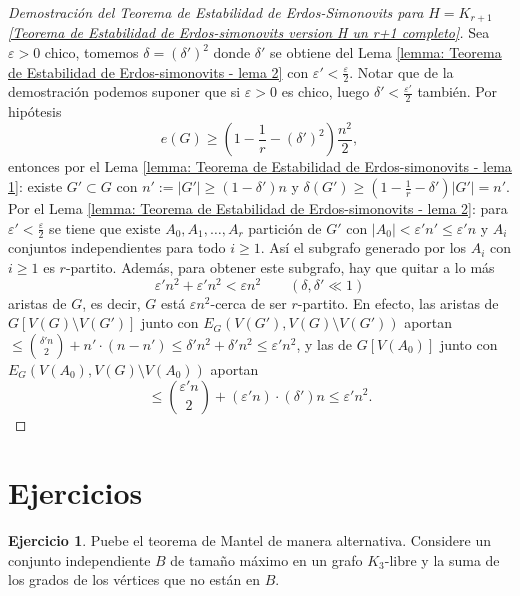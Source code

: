 \documentclass[12pt]{report}
\theoremstyle{plain}
\theoremstyle{definition}
\newtheorem{exercise}[theorem]{Ejercicio}
\newcommand{\abs}[1]{\left \vert #1 \right \vert}
\begin{document}
\begin{proof}[Demostración del Teorema de Estabilidad de Erdos-Simonovits para $H =K_{r+1}$ \ref{Teorema de Estabilidad de Erdos-simonovits version H un r+1 completo}]

Sea $\varepsilon > 0$ chico, tomemos $\delta = (\delta ')^2$ donde $\delta'$ se obtiene del Lema \ref{lemma: Teorema de Estabilidad de Erdos-simonovits - lema 2} con $\varepsilon ' < \frac \varepsilon 2$. Notar que de la demostración podemos suponer que si $\varepsilon > 0$ es chico, luego $\delta ' < \frac {\varepsilon ' }2$ también. Por hipótesis
\[
    e(G) \geq \left ( 1 - \frac 1 r - (\delta ')^2 \right ) \frac{n^2}{2},
\]
entonces por el Lema \ref{lemma: Teorema de Estabilidad de Erdos-simonovits - lema 1}: existe $G' \subset G$ con $n' := \abs{G'} \geq ( 1 - \delta ')n$ y $\delta (G') \geq \left ( 1 - \frac 1 r - \delta' \right) \abs {G'} = n'$. Por el Lema \ref{lemma: Teorema de Estabilidad de Erdos-simonovits - lema 2}: para $\varepsilon ' < \frac \varepsilon 2$ se tiene que existe $A_0, A_1, \ldots, A_r$ partición de $G'$ con $\abs {A_0} < \varepsilon ' n ' \leq \varepsilon ' n$ y $A_i$ conjuntos independientes para todo $i \geq 1$. Así el subgrafo generado por los $A_i$ con $i \geq 1$ es $r$-partito. Además, para obtener este subgrafo, hay que quitar a lo más
\[
    \varepsilon ' n ^2 + \varepsilon ' n^2 < \varepsilon n^2 \quad \quad ( \delta , \delta ' \ll 1)
\]
aristas de $G$, es decir, $G$ está $\varepsilon n^2$-cerca de ser $r$-partito. En efecto, las aristas de $G[V(G) \setminus V(G')]$ junto con $E_G(V(G'), V(G) \setminus V(G'))$ aportan $\leq \binom { \delta ' n} 2 + n' \cdot (n - n') \leq \delta ' n^2 + \delta ' n^2 \leq \varepsilon ' n^2$, y las de $G[V(A_0)]$ junto con $E_G(V(A_0), V(G) \setminus V(A_0))$ aportan
\[
    \leq \binom{\varepsilon' n}2 + (\varepsilon ' n) \cdot (\delta ') n \leq \varepsilon ' n^2.
\]
\end{proof}







\section{Ejercicios}

\begin{exercise}
Puebe el teorema de Mantel de manera alternativa. Considere un conjunto independiente $B$ de tamaño máximo en un grafo $K_3$-libre  y la suma de los grados de los vértices que no están en $B$.
\end{exercise}
\end{document}
